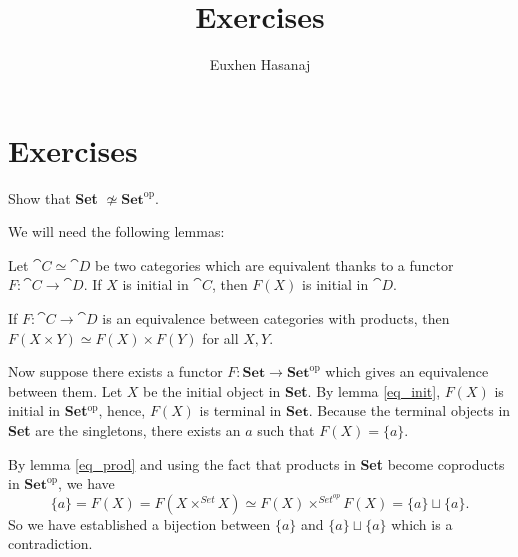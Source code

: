 \documentclass[11pt,a4paper]{article}
\author{Euxhen Hasanaj}
\title{Exercises}
\begin{document}
\maketitle

\section{Exercises}
\begin{exercise}
    Show that \textbf{Set} $\not\simeq \textbf{Set}^\text{op}$.
\end{exercise}
\begin{solution}
We will need the following lemmas:
\begin{lemma}\label{eq_init}
    Let $\cat{C}\simeq\cat{D}$ be two categories which are equivalent thanks to a functor $F:\cat{C}\to\cat{D}$. If $X$ is initial in $\cat{C}$, then $F(X)$ is initial in $\cat{D}$.
\end{lemma}
\begin{lemma}\label{eq_prod}
    If $F:\cat{C}\to\cat{D}$ is an equivalence between categories with products, then $F(X\times Y)\simeq F(X)\times F(Y)$ for all $X,Y$.
\end{lemma}
Now suppose there exists a functor $F: \textbf{Set}\to\textbf{Set}^{\text{op}}$ which gives an equivalence between them. Let $X$ be the initial object in \textbf{Set}. By lemma \ref{eq_init}, $F(X)$ is initial in \textbf{Set}$^{\text{op}}$, hence, $F(X)$ is terminal in $\textbf{Set}$. Because the terminal objects in \textbf{Set} are the singletons, there exists an $a$ such that $F(X) = \{a\}$.\par
    By lemma \ref{eq_prod} and using the fact that products in \textbf{Set} become coproducts in $\textbf{Set}^{\text{op}}$, we have
    \begin{equation*}
        \{a\} = F(X) = F(X\times^{Set} X)\simeq F(X)\times^{Set^{op}}F(X) = \{a\}\sqcup\{a\}.
    \end{equation*}
    So we have established a bijection between $\{a\}$ and $\{a\}\sqcup\{a\}$ which is a contradiction.
\end{solution}
\end{document}
